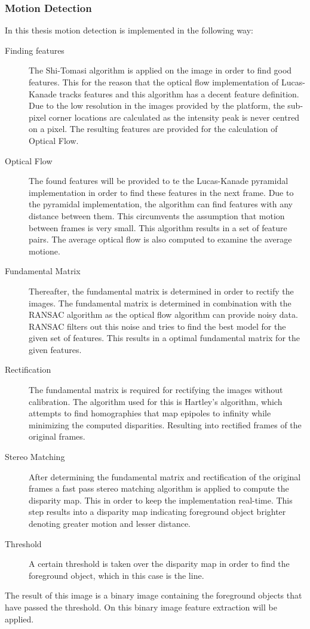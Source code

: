 \documentclass[a4paper]{article}
\begin{document}
\subsubsection{Motion Detection}
In this thesis motion detection is implemented in the following way:
\begin{description}
\item[Finding features] The Shi-Tomasi algorithm \cite{Shi1994} is applied on the image in order to find good features. This for the reason that the optical flow implementation of Lucas-Kanade tracks features and this algorithm has a decent feature definition. Due to the low resolution in the images provided by the platform, the sub-pixel corner locations are calculated as the intensity peak is never centred on a pixel. The resulting features are provided for the calculation of Optical Flow.

\item[Optical Flow] The found features will be provided to te the Lucas-Kanade pyramidal implementation in order to find these features in the next frame. Due to the pyramidal implementation, the algorithm can find features with any distance between them. This circumvents the assumption that motion between frames is very small. This algorithm results in a set of feature pairs. The average optical flow is also computed to examine the average motione.

\item[Fundamental Matrix] Thereafter, the fundamental matrix is determined in order to rectify the images. The fundamental matrix is determined in combination with the RANSAC algorithm as the optical flow algorithm can provide noisy data. RANSAC filters out this noise and tries to find the best model for the given set of features. This results in a optimal fundamental matrix for the given features.

\item[Rectification] The fundamental matrix is required for rectifying the images without calibration. The algorithm used for this is Hartley's algorithm, which attempts to find homographies that map epipoles to infinity while minimizing the computed disparities. Resulting into rectified frames of the original frames.

\item[Stereo Matching] After determining the fundamental matrix and rectification of the original frames a fast pass stereo matching algorithm \cite{Gutmann2000} is applied to compute the disparity map. This in order to keep the implementation real-time. This step results into a disparity map indicating foreground object brighter denoting greater motion and lesser distance.

\item[Threshold] A certain threshold is taken over the disparity map in order to find the foreground object, which in this case is the line.
\end{description}
The result of this image is a binary image containing the foreground objects that have passed the threshold. On this binary image feature extraction will be applied.
\end{document}
